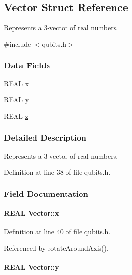 \hypertarget{structVector}{
\subsection{Vector Struct Reference}
\label{structVector}
}


Represents a 3-\/vector of real numbers.  


{\ttfamily \#include $<$qubits.h$>$}\subsubsection*{Data Fields}
\begin{DoxyCompactItemize}
\item 
REAL \hyperlink{structVector_aac7abe171ba4bada50ed72acba6259fc}{x}
\item 
REAL \hyperlink{structVector_a375ca805d4c808a53d7c4e0c737ae3de}{y}
\item 
REAL \hyperlink{structVector_ad4e863651be7d6b7e2b28cd7445a0ccf}{z}
\end{DoxyCompactItemize}


\subsubsection{Detailed Description}
Represents a 3-\/vector of real numbers. 

Definition at line 38 of file qubits.h.

\subsubsection{Field Documentation}
\hypertarget{structVector_aac7abe171ba4bada50ed72acba6259fc}{
\paragraph[{x}]{\setlength{\rightskip}{0pt plus 5cm}REAL {\bf Vector::x}}\hfill}
\label{structVector_aac7abe171ba4bada50ed72acba6259fc}


Definition at line 40 of file qubits.h.

Referenced by rotateAroundAxis().\hypertarget{structVector_a375ca805d4c808a53d7c4e0c737ae3de}{
\paragraph[{y}]{\setlength{\rightskip}{0pt plus 5cm}REAL {\bf Vector::y}}\hfill}
\label{structVector_a375ca805d4c808a53d7c4e0c737ae3de}


